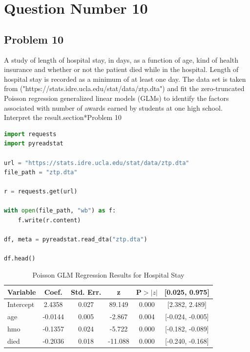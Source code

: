 \documentclass[12pt,a4paper]{report}
\begin{document}
\chapter*{Question Number 10}
\section*{Problem 10}

A study of length of hospital stay, in days, as a function of age, kind of health insurance and whether or not the patient died while in the hospital.
Length of hospital stay is recorded as a minimum of at least one day.
The data set is taken from ("https://stats.idre.ucla.edu/stat/data/ztp.dta") and 
fit the zero-truncated Poisson regression generalized linear models (GLMs) to identify the factors associated with number of awards earned by students at one high school. 
Interpret the result.section*{Problem 10}
\begin{lstlisting}[language=Python, caption=Loading Stata Dataset in Python]
import requests
import pyreadstat

url = "https://stats.idre.ucla.edu/stat/data/ztp.dta"
file_path = "ztp.dta"

r = requests.get(url)

with open(file_path, "wb") as f:
    f.write(r.content)

df, meta = pyreadstat.read_dta("ztp.dta")

df.head()
\end{lstlisting}
\begin{table}[h!]
\centering
\begin{tabular}{|l|c|c|c|c|c|}
\hline
\textbf{Variable} & \textbf{Coef.} & \textbf{Std. Err.} & \textbf{z} & \textbf{P$>|z|$} & \textbf{[0.025, 0.975]} \\ \hline
Intercept & 2.4358 & 0.027 & 89.149 & 0.000 & [2.382, 2.489] \\ \hline
age       & -0.0144 & 0.005 & -2.867 & 0.004 & [-0.024, -0.005] \\ \hline
hmo       & -0.1357 & 0.024 & -5.722 & 0.000 & [-0.182, -0.089] \\ \hline
died      & -0.2036 & 0.018 & -11.088 & 0.000 & [-0.240, -0.168] \\ \hline
\end{tabular}
\caption{Poisson GLM Regression Results for Hospital Stay}
\label{tab:poisson_glm_stay}
\end{table}
\end{document}
